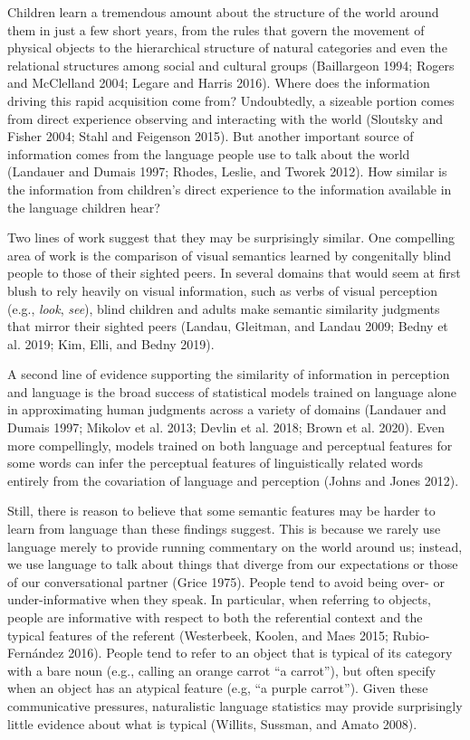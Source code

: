 \documentclass{ucetd}
\begin{document}
Children learn a tremendous amount about the structure of the world
around them in just a few short years, from the rules that govern the
movement of physical objects to the hierarchical structure of natural
categories and even the relational structures among social and cultural
groups (Baillargeon 1994; Rogers and McClelland 2004; Legare and Harris
2016). Where does the information driving this rapid acquisition come
from? Undoubtedly, a sizeable portion comes from direct experience
observing and interacting with the world (Sloutsky and Fisher 2004;
Stahl and Feigenson 2015). But another important source of information
comes from the language people use to talk about the world (Landauer and
Dumais 1997; Rhodes, Leslie, and Tworek 2012). How similar is the
information from children's direct experience to the information
available in the language children hear?

Two lines of work suggest that they may be surprisingly similar. One
compelling area of work is the comparison of visual semantics learned by
congenitally blind people to those of their sighted peers. In several
domains that would seem at first blush to rely heavily on visual
information, such as verbs of visual perception (e.g., \emph{look},
\emph{see}), blind children and adults make semantic similarity
judgments that mirror their sighted peers (Landau, Gleitman, and Landau
2009; Bedny et al. 2019; Kim, Elli, and Bedny 2019).

A second line of evidence supporting the similarity of information in
perception and language is the broad success of statistical models
trained on language alone in approximating human judgments across a
variety of domains (Landauer and Dumais 1997; Mikolov et al. 2013;
Devlin et al. 2018; Brown et al. 2020). Even more compellingly, models
trained on both language and perceptual features for some words can
infer the perceptual features of linguistically related words entirely
from the covariation of language and perception (Johns and Jones 2012).

Still, there is reason to believe that some semantic features may be
harder to learn from language than these findings suggest. This is
because we rarely use language merely to provide running commentary on
the world around us; instead, we use language to talk about things that
diverge from our expectations or those of our conversational partner
(Grice 1975). People tend to avoid being over- or under-informative when
they speak. In particular, when referring to objects, people are
informative with respect to both the referential context and the typical
features of the referent (Westerbeek, Koolen, and Maes 2015;
Rubio-Fernández 2016). People tend to refer to an object that is typical
of its category with a bare noun (e.g., calling an orange carrot ``a
carrot''), but often specify when an object has an atypical feature
(e.g, ``a purple carrot''). Given these communicative pressures,
naturalistic language statistics may provide surprisingly little
evidence about what is typical (Willits, Sussman, and Amato 2008).
\end{document}
